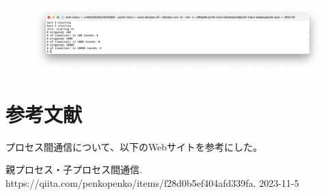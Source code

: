 \documentclass[11pt,a4paper]{jsarticle}
\begin{document}
\begin{figure}[H]
\includegraphics[width=0.8\linewidth]{image/figure2.png}
\end{figure}

\section{参考文献}
プロセス間通信について、以下のWebサイトを参考にした。

親プロセス・子プロセス間通信. https://qiita.com/penkopenko/items/f28d0b5ef404afd339fa. 2023-11-5
%
%
\end{document}
